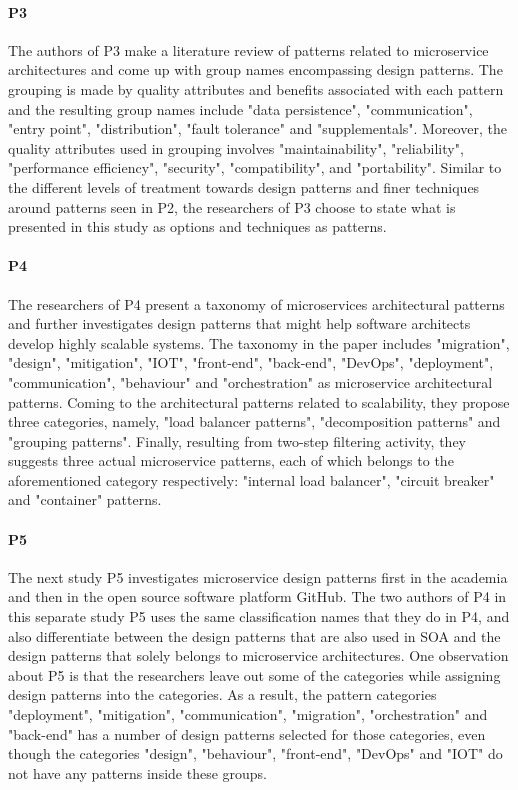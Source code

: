 \documentclass{Configuration_Files/PoliMi3i_thesis}
\begin{document}
\paragraph{P3} The authors of P3 make a literature review of patterns related to microservice architectures and come up with group names encompassing design patterns.
The grouping is made by quality attributes and benefits associated with each pattern and the resulting group names include "data persistence", "communication", "entry point", "distribution", "fault tolerance" and "supplementals".
Moreover, the quality attributes used in grouping involves "maintainability", "reliability", "performance efficiency", "security", "compatibility", and "portability".
Similar to the different levels of treatment towards design patterns and finer techniques around patterns seen in P2, the researchers of P3 choose to state what is presented in this study as options and techniques as patterns.

\paragraph{P4} The researchers of P4 present a taxonomy of microservices architectural patterns and further investigates design patterns that might help software architects develop highly scalable systems.
The taxonomy in the paper includes "migration", "design", "mitigation", "IOT", "front-end", "back-end", "DevOps", "deployment", "communication", "behaviour" and "orchestration" as microservice architectural patterns.
Coming to the architectural patterns related to scalability, they propose three categories, namely, "load balancer patterns", "decomposition patterns" and "grouping patterns".
Finally, resulting from two-step filtering activity, they suggests three actual microservice patterns, each of which belongs to the aforementioned category respectively: "internal load balancer", "circuit breaker" and "container" patterns.

\paragraph{P5} The next study P5 investigates microservice design patterns first in the academia and then in the open source software platform GitHub.
The two authors of P4 in this separate study P5 uses the same classification names that they do in P4, and also differentiate between the design patterns that are also used in SOA and the design patterns that solely belongs to microservice architectures.
One observation about P5 is that the researchers leave out some of the categories while assigning design patterns into the categories.
As a result, the pattern categories "deployment", "mitigation", "communication", "migration", "orchestration" and "back-end" has a number of design patterns selected for those categories, even though the categories "design", "behaviour", "front-end", "DevOps" and "IOT" do not have any patterns inside these groups.
\end{document}
